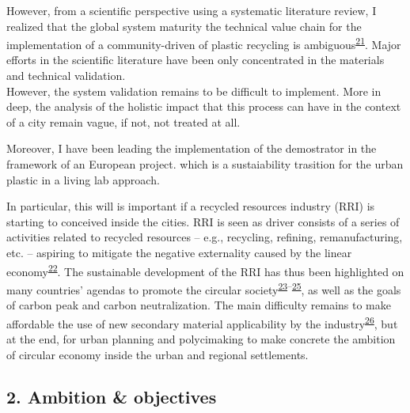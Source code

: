 \documentclass[
  11pt,
  a4paperpaper,
  onecolumn]{article}
\begin{document}
However, from a scientific perspective using a systematic literature
review, I realized that the global system maturity the technical value
chain for the implementation of a community-driven of plastic recycling
is
ambiguous\textsuperscript{\protect\hyperlink{ref-CruzSanchez2020}{21}}.
Major efforts in the scientific literature have been only concentrated
in the materials and technical validation.\\
However, the system validation remains to be difficult to implement.
More in deep, the analysis of the holistic impact that this process can
have in the context of a city remain vague, if not, not treated at all.

Moreover, I have been leading the implementation of the demostrator in
the framework of an European project. which is a sustaiability trasition
for the urban plastic in a living lab approach.

In particular, this will is important if a recycled resources industry
(RRI) is starting to conceived inside the cities. RRI is seen as driver
consists of a series of activities related to recycled resources --
e.g., recycling, refining, remanufacturing, etc. -- aspiring to mitigate
the negative externality caused by the linear
economy\textsuperscript{\protect\hyperlink{ref-wang2019b}{22}}. The
sustainable development of the RRI has thus been highlighted on many
countries' agendas to promote the circular
society\textsuperscript{\protect\hyperlink{ref-leipold2021}{23}--\protect\hyperlink{ref-jaeger-erben2021a}{25}},
as well as the goals of carbon peak and carbon neutralization. The main
difficulty remains to make affordable the use of new secondary material
applicability by the
industry\textsuperscript{\protect\hyperlink{ref-klotz2022}{26}}, but at
the end, for urban planning and polycimaking to make concrete the
ambition of circular economy inside the urban and regional settlements.

\hypertarget{ambition-objectives}{%
\subsection{2. Ambition \& objectives}\label{ambition-objectives}}
\end{document}
